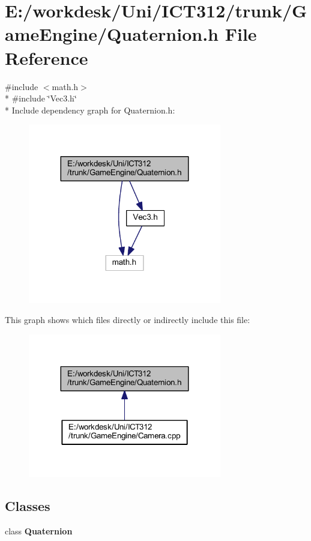 \section{E\+:/workdesk/\+Uni/\+I\+C\+T312/trunk/\+Game\+Engine/\+Quaternion.h File Reference}
\label{_quaternion_8h}
{\ttfamily \#include $<$math.\+h$>$}\\*
{\ttfamily \#include \char`\"{}Vec3.\+h\char`\"{}}\\*
Include dependency graph for Quaternion.\+h\+:\nopagebreak
\begin{figure}[H]
\begin{center}
\leavevmode
\includegraphics[width=239pt]{db/da1/_quaternion_8h__incl}
\end{center}
\end{figure}
This graph shows which files directly or indirectly include this file\+:\nopagebreak
\begin{figure}[H]
\begin{center}
\leavevmode
\includegraphics[width=239pt]{da/dd1/_quaternion_8h__dep__incl}
\end{center}
\end{figure}
\subsection*{Classes}
\begin{DoxyCompactItemize}
\item 
class {\bf Quaternion}
\end{DoxyCompactItemize}
